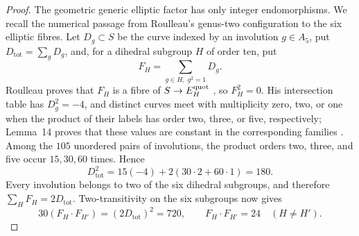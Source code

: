 \begin{proof}
The geometric generic elliptic factor has only integer endomorphisms.  We
recall the numerical passage from
Roulleau's genus-two configuration to the six elliptic fibres.  Let \(D_g\subset S\) be the curve indexed by an
involution \(g\in A_5\), put \(D_{\mathrm{tot}}=\sum_gD_g\), and, for a
dihedral subgroup \(H\) of order ten, put
\[
 F_H=\sum_{g\in H,\;g^2=1}D_g.
\]
Roulleau proves that \(F_H\) is a fibre of \(S\to E_H^{\rm quot}\)
\cite[Theorem~11(D)]{Roulleau}, so \(F_H^2=0\).  His intersection table has
\(D_g^2=-4\), and distinct curves meet with multiplicity zero, two, or one
when the product of their labels has order two, three, or five, respectively;
Lemma~14 proves that these values are constant in the corresponding families
\cite[Lemma~14, Corollary~16, and (3.1)]{Roulleau}.  Among
the \(105\) unordered pairs of involutions, the product orders two, three,
and five occur \(15,30,60\) times.  Hence
\[
 D_{\mathrm{tot}}^2
 =15(-4)+2(30\cdot2+60\cdot1)=180.
\]
Every involution belongs to two of the six dihedral subgroups, and therefore
\(\sum_HF_H=2D_{\mathrm{tot}}\).  Two-transitivity on the six subgroups now
gives
\[
 30(F_H\cdot F_{H'})=(2D_{\mathrm{tot}})^2=720,
 \qquad F_H\cdot F_{H'}=24\quad(H\ne H').
\]


\end{proof}
